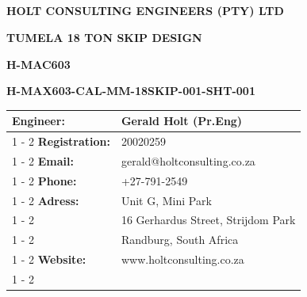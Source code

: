 \documentclass{article}%
\begin{document}
%
\pagestyle{empty}%
\normalsize%
\pagestyle{header}%
\begin{center}%
\section*{}%
\label{sec:}%
\begin{minipage}{\textwidth}%
\centering%
\begin{Large}%
\textbf{HOLT CONSULTING ENGINEERS (PTY) LTD}%
\end{Large}%
\vspace*{20pt}%
\linebreak%
\begin{large}%
\textbf{TUMELA 18 TON SKIP DESIGN}%
\end{large}%
\vspace*{20pt}%
\linebreak%
\begin{large}%
\textbf{H{-}MAC603}%
\end{large}%
\vspace*{20pt}%
\linebreak%
\begin{large}%
\textbf{H{-}MAX603{-}CAL{-}MM{-}18SKIP{-}001{-}SHT{-}001}%
\end{large}%
\vspace*{80pt}%
\end{minipage}

%
\end{center}%
\begin{center}%
\begin{minipage}{\textwidth}%
\flushleft%
\begin{tabular}{|l |l |}%
\hline%
\textbf{Engineer:}&Gerald Holt (Pr.Eng)\\%
\cline{1%
-%
2}%
\textbf{Registration:}&20020259\\%
\cline{1%
-%
2}%
\textbf{Email:}&gerald@holtconsulting.co.za\\%
\cline{1%
-%
2}%
\textbf{Phone:}&+27{-}791{-}2549\\%
\cline{1%
-%
2}%
\textbf{Adress:}&Unit G, Mini Park\\%
\cline{1%
-%
2}%
\textbf{}&16 Gerhardus Street, Strijdom Park\\%
\cline{1%
-%
2}%
\textbf{}&Randburg, South Africa\\%
\cline{1%
-%
2}%
\textbf{Website:}&www.holtconsulting.co.za\\%
\cline{1%
-%
2}%
\end{tabular}%
\vspace*{150pt}%
\centering%
\end{minipage}%
\end{center}%
\end{document}
